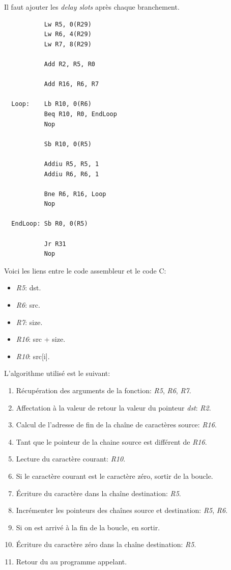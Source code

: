 \begin{correction}

  Il faut ajouter les \textit{delay slots} apr\`es chaque branchement.

  \begin{verbatim}
           Lw R5, 0(R29)
           Lw R6, 4(R29)
           Lw R7, 8(R29)

           Add R2, R5, R0

           Add R16, R6, R7

  Loop:    Lb R10, 0(R6)
           Beq R10, R0, EndLoop
           Nop

           Sb R10, 0(R5)

           Addiu R5, R5, 1
           Addiu R6, R6, 1

           Bne R6, R16, Loop
           Nop

  EndLoop: Sb R0, 0(R5)

           Jr R31
           Nop
  \end{verbatim}

  Voici les liens entre le code assembleur et le code C:

  \begin{itemize}
    \item
      \textit{R5}: dst.
    \item
      \textit{R6}: src.
    \item
      \textit{R7}: size.
    \item
      \textit{R16}: src + size.
    \item
      \textit{R10}: src[i].
  \end{itemize}

  L'algorithme utilis\'e est le suivant:

  \begin{enumerate}
    \item
      R\'ecup\'eration des arguments de la fonction: \textit{R5}, \textit{R6},
      \textit{R7}.
    \item
      Affectation \`a la valeur de retour la valeur du pointeur \textit{dst}:
      \textit{R2}.
    \item
      Calcul de l'adresse de fin de la cha\^ine de caract\`eres source:
      \textit{R16}.
    \item
      Tant que le pointeur de la chaine source est diff\'erent de \textit{R16}.
    \item
      Lecture du caract\`ere courant: \textit{R10}.
    \item
      Si le caract\`ere courant est le caract\`ere z\'ero, sortir de la boucle.
    \item
      \'Ecriture du caract\`ere dans la cha\^ine destination: \textit{R5}.
    \item
      Incr\'ementer les pointeurs des cha\^ines source et destination:
      \textit{R5}, \textit{R6}.
    \item
      Si on est arriv\'e \`a la fin de la boucle, en sortir.
    \item
      \'Ecriture du caract\`ere z\'ero dans la cha\^ine destination:
      \textit{R5}.
    \item
      Retour du au programme appelant.
  \end{enumerate}


\end{correction}
